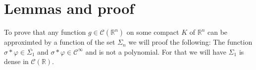 \documentclass[../main.tex]{subfiles}
\begin{document}
	\chapter{Lemmas and proof} \label{ch:proof}
	\noindent To prove that any function $g\in \mathcal{C}(\mathbb{R}^n)$ on some compact $K$ of $\mathbb{R}^n$ can be approximted by a function of the set $\Sigma_n$ we will proof the following: The function $\sigma \ast \varphi \in \overline{\Sigma_1}$ and $\sigma \ast \varphi \in \mathcal{C}^\infty $ and is not a polynomial. For that we will have $\Sigma_1$ is dense in $\mathcal{C}(\mathbb{R})$.
	\usetikzlibrary{positioning}
	\\ \\ 

\end{document}
